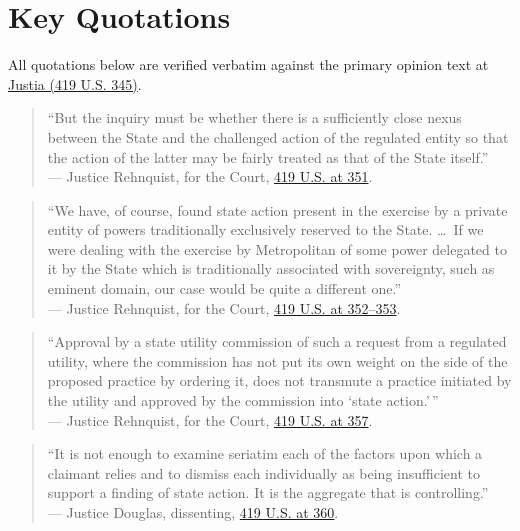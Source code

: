 \documentclass[12pt]{article}
\begin{document}
\section{Key Quotations}

All quotations below are verified verbatim against the primary opinion text at \href{https://supreme.justia.com/cases/federal/us/419/345/}{Justia (419 U.S. 345)}.

\begin{quote}
``But the inquiry must be whether there is a sufficiently close nexus between the State and the challenged action of the regulated entity so that the action of the latter may be fairly treated as that of the State itself.'' \\
--- Justice Rehnquist, for the Court, \href{https://supreme.justia.com/cases/federal/us/419/345/}{419 U.S. at 351}.
\end{quote}

\begin{quote}
``We have, of course, found state action present in the exercise by a private entity of powers traditionally exclusively reserved to the State. \dots\ If we were dealing with the exercise by Metropolitan of some power delegated to it by the State which is traditionally associated with sovereignty, such as eminent domain, our case would be quite a different one.'' \\
--- Justice Rehnquist, for the Court, \href{https://supreme.justia.com/cases/federal/us/419/345/}{419 U.S. at 352--353}.
\end{quote}

\begin{quote}
``Approval by a state utility commission of such a request from a regulated utility, where the commission has not put its own weight on the side of the proposed practice by ordering it, does not transmute a practice initiated by the utility and approved by the commission into `state action.'\,'' \\
--- Justice Rehnquist, for the Court, \href{https://supreme.justia.com/cases/federal/us/419/345/}{419 U.S. at 357}.
\end{quote}

\begin{quote}
``It is not enough to examine seriatim each of the factors upon which a claimant relies and to dismiss each individually as being insufficient to support a finding of state action. It is the aggregate that is controlling.'' \\
--- Justice Douglas, dissenting, \href{https://supreme.justia.com/cases/federal/us/419/345/}{419 U.S. at 360}.
\end{quote}
\end{document}
